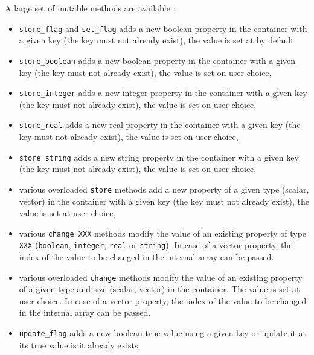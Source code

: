 \pn A large set of mutable methods are available :

\begin{itemize}

\item \texttt{store\_flag}  and \texttt{set\_flag} adds  a new boolean
  property in the container with a given key (the key must not already
  exist), the value is set at  by default

\item \texttt{store\_boolean} adds a new boolean property in the container
with a given key (the key must not already exist), the value is set on user
choice,

\item \texttt{store\_integer} adds a new integer property in the container
with a given key (the key must not already exist), the value is set on user
choice,

\item \texttt{store\_real} adds a new real property in the container
with a given key (the key must not already exist), the value is set on user
choice,

\item \texttt{store\_string} adds a new string property in the container
with a given key (the key must not already exist), the value is set on user
choice,

\item various overloaded \texttt{store}  methods add a new property of
  a given type (scalar, vector) in the container with a given key (the
  key must not already exist), the value is set at user choice,

\item  various \texttt{change\_XXX}  methods  modify the  value of  an
  existing   property    of   type   \texttt{XXX}   (\texttt{boolean},
  \texttt{integer},  \texttt{real} or \texttt{string}).  In case  of a
  vector  property,  the index  of  the value  to  be  changed in  the
  internal array can be passed.

\item various  overloaded \texttt{change} methods modify  the value of
  an existing  property of a given  type and size  (scalar, vector) in
  the container.  The value is set at user choice. In case of a vector
  property, the index of the value to be changed in the internal array
  can be passed.

\item \texttt{update\_flag} adds a new boolean true value using a given
key or update it at its true value is it already exists.


\end{itemize}
